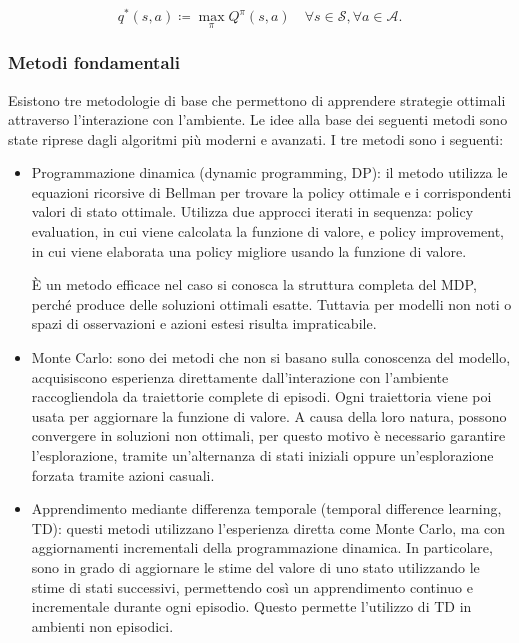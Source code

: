 \begin{equation}
    q^*(s, a) \coloneqq \max_\pi Q^\pi(s, a) \quad \forall s \in \mathcal{S}, \forall a \in \mathcal{A}.
\end{equation}

\subsubsection{Metodi fondamentali}

Esistono tre metodologie di base che permettono di apprendere strategie ottimali attraverso l'interazione con l'ambiente. Le idee alla base dei seguenti metodi sono state riprese dagli algoritmi più moderni e avanzati. I tre metodi sono i seguenti:

\begin{itemize}
    \item Programmazione dinamica (dynamic programming, DP): il metodo utilizza le equazioni ricorsive di Bellman per trovare la policy ottimale e i corrispondenti valori di stato ottimale. Utilizza due approcci iterati in sequenza: policy evaluation, in cui viene calcolata la funzione di valore, e policy improvement, in cui viene elaborata una policy migliore usando la funzione di valore.

    È un metodo efficace nel caso si conosca la struttura completa del MDP, perché produce delle soluzioni ottimali esatte. Tuttavia per modelli non noti o spazi di osservazioni e azioni estesi risulta impraticabile.

    \item Monte Carlo: sono dei metodi che non si basano sulla conoscenza del modello, acquisiscono esperienza direttamente dall'interazione con l'ambiente raccogliendola da traiettorie complete di episodi. Ogni traiettoria viene poi usata per aggiornare la funzione di valore. A causa della loro natura, possono convergere in soluzioni non ottimali, per questo motivo è necessario garantire l'esplorazione, tramite un'alternanza di stati iniziali oppure un'esplorazione forzata tramite azioni casuali.

    \item Apprendimento mediante differenza temporale (temporal difference learning, TD): questi metodi utilizzano l'esperienza diretta come Monte Carlo, ma con aggiornamenti incrementali della programmazione dinamica. In particolare, sono in grado di aggiornare le stime del valore di uno stato utilizzando le stime di stati successivi, permettendo così un apprendimento continuo e incrementale durante ogni episodio. Questo permette l'utilizzo di TD in ambienti non episodici.
\end{itemize}

